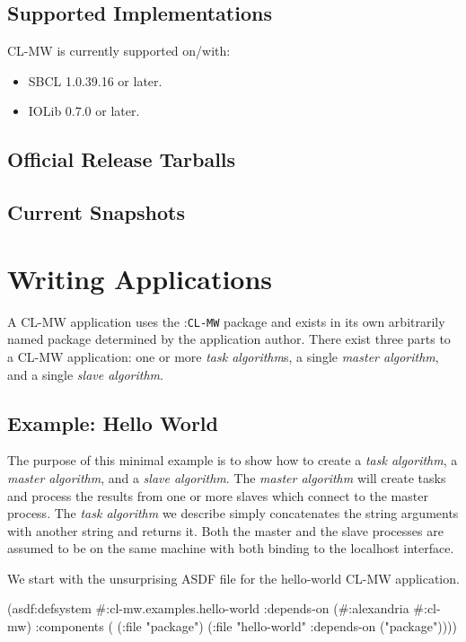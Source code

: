 \documentclass[titlepage,12pt]{book}
\newcommand{\xsmall}{\latexhtml{\small}{}}
\newcommand{\xnormalsize}{\latexhtml{\normalsize}{}}
\newcommand{\clmw}{\xsmall\textsc{CL-MW}\xnormalsize\xspace}
\newcommand{\package}[1]{\mbox{:\uppercase{\xsmall\texttt{#1}\xnormalsize}} package\xspace}
\newcommand{\mwpackage}{\package{CL-MW}}
\newcommand{\sa}{\textit{slave algorithm}\xspace}
\newcommand{\ma}{\textit{master algorithm}\xspace}
\newcommand{\ta}{\textit{task algorithm}\xspace}
\newcommand{\tas}{\textit{task algorithm}s\xspace}
\newcommand{\file}[1]{\texttt{#1}\xspace}
\newcommand{\Todo}{\begin{center}\fbox{\textbf{TODO}}\end{center}}
\begin{document}
\section{Supported Implementations}

\clmw is currently supported on/with: 

\begin{itemize}
\item SBCL 1.0.39.16 or later.
\item IOLib 0.7.0 or later.
\end{itemize}

\section{Official Release Tarballs}

\Todo

\section{Current Snapshots}

\Todo

\chapter{Writing Applications}

A \clmw application uses the \mwpackage and exists in its own
arbitrarily named package determined by the application author.
There exist three parts to a \clmw application: one or more \tas,
a single \ma, and a single \sa.

\section{Example: Hello World}

The purpose of this minimal example is to show how to create a \ta,
a \ma, and a \sa. The \ma will create tasks and process the results
from one or more slaves which connect to the master process. The \ta we
describe simply concatenates the string arguments with another string
and returns it. Both the master and the slave processes are assumed
to be on the same machine with both binding to the localhost interface.

We start with the unsurprising ASDF file for the hello-world \clmw application.

\begin{lisp}[caption=\file{cl-mw.examples.hello-world.asd}]
(asdf:defsystem #:cl-mw.examples.hello-world
  :depends-on (#:alexandria #:cl-mw)
  :components ( (:file "package")
                (:file "hello-world"
                       :depends-on ("package"))))
\end{lisp}
\end{document}
